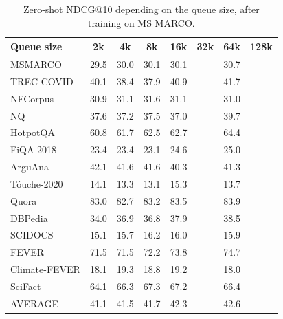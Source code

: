 \begin{table}[t!]
  \small
  \center
  \begin{tabular}{@{}l  c c c c c c c @{}}
    \toprule
    \textbf{Queue size} & 2k & 4k & 8k & 16k & 32k & 64k & 128k \\
    \midrule
    MSMARCO       & 29.5 & 30.0 & 30.1 & 30.1 & & 30.7 \\
    TREC-COVID    & 40.1 & 38.4 & 37.9 & 40.9 & & 41.7 \\
    NFCorpus      & 30.9 & 31.1 & 31.6 & 31.1 & & 31.0 \\
    NQ            & 37.6 & 37.2 & 37.5 & 37.0 & & 39.7 \\
    HotpotQA      & 60.8 & 61.7 & 62.5 & 62.7 & & 64.4 \\
    FiQA-2018     & 23.4 & 23.4 & 23.1 & 24.6 & & 25.0 \\
    ArguAna       & 42.1 & 41.6 & 41.6 & 40.3 & & 41.3 \\
    T\'ouche-2020 & 14.1 & 13.3 & 13.1 & 15.3 & & 13.7 \\
    Quora         & 83.0 & 82.7 & 83.2 & 83.5 & & 83.9 \\
    DBPedia       & 34.0 & 36.9 & 36.8 & 37.9 & & 38.5 \\
    SCIDOCS       & 15.1 & 15.7 & 16.2 & 16.0 & & 15.9 \\
    FEVER         & 71.5 & 71.5 & 72.2 & 73.8 & & 74.7 \\
    Climate-FEVER & 18.1 & 19.3 & 18.8 & 19.2 & & 18.0 \\
    SciFact       & 64.1 & 66.3 & 67.3 & 67.2 & & 66.4 \\
    \midrule
    AVERAGE       & 41.1 & 41.5 & 41.7 & 42.3 & & 42.6 \\
    \bottomrule
  \end{tabular}
  \caption{Zero-shot NDCG@10 depending on the queue size, after training on MS MARCO.}
  \label{tab:ndcg_msmarco_queue_size}
\end{table}











